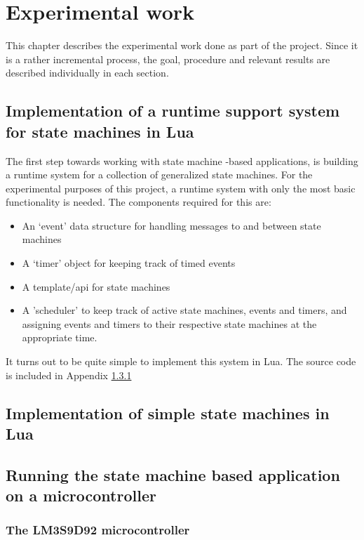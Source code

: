 \chapter{Experimental work}
\label{ch:experimental_work}
This chapter describes the experimental work done as part of the project. Since it is a rather incremental process, the goal, procedure and relevant results are described individually in each section.

\section{Implementation of a runtime support system for state machines in Lua}
\label{sec:impl_runtime_support}
The first step towards working with state machine -based applications, is building a runtime system for a collection of generalized state machines. For the experimental purposes of this project, a runtime system with only the most basic functionality is needed. The components required for this are:

\begin{itemize}
	\item An ‘event’ data structure for handling messages to and between state machines
	\item A ‘timer’ object for keeping track of timed events
	\item A template/\gls{api} for state machines
	\item A 'scheduler' to keep track of active state machines, events and timers, and assigning events and timers to their respective state machines at the appropriate time.
\end{itemize}

It turns out to be quite simple to implement this system in Lua. The source code is included in Appendix \ref{}

\section{Implementation of simple state machines in Lua}
\label{sec:impl_state_machines}

\section{Running the state machine based application on a microcontroller}
\label{sec:running_on_micro}

\subsection{The LM3S9D92 microcontroller}

